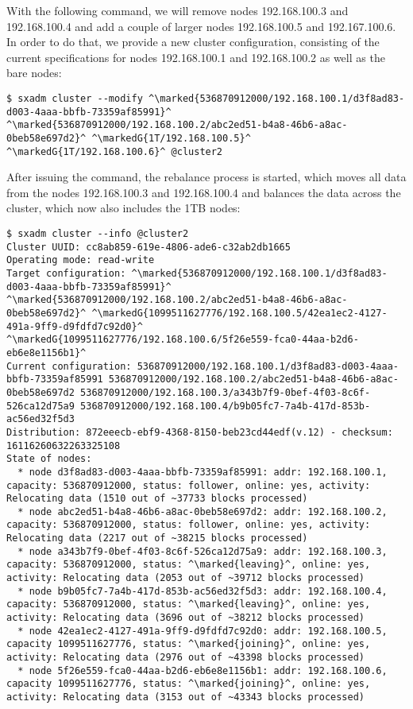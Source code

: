 With the following command, we will remove nodes 192.168.100.3 and
192.168.100.4 and add a couple of larger nodes 192.168.100.5 and
192.167.100.6. In order to do that, we provide a new cluster configuration,
consisting of the current specifications for nodes 192.168.100.1 and
192.168.100.2 as well as the bare nodes:
\begin{lstlisting}
$ sxadm cluster --modify ^\marked{536870912000/192.168.100.1/d3f8ad83-d003-4aaa-bbfb-73359af85991}^ ^\marked{536870912000/192.168.100.2/abc2ed51-b4a8-46b6-a8ac-0beb58e697d2}^ ^\markedG{1T/192.168.100.5}^ ^\markedG{1T/192.168.100.6}^ @cluster2
\end{lstlisting}
After issuing the command, the rebalance process is started, which moves all
data from the nodes 192.168.100.3 and 192.168.100.4 and balances the data across
the cluster, which now also includes the 1TB nodes:
\begin{lstlisting}
$ sxadm cluster --info @cluster2
Cluster UUID: cc8ab859-619e-4806-ade6-c32ab2db1665
Operating mode: read-write
Target configuration: ^\marked{536870912000/192.168.100.1/d3f8ad83-d003-4aaa-bbfb-73359af85991}^ ^\marked{536870912000/192.168.100.2/abc2ed51-b4a8-46b6-a8ac-0beb58e697d2}^ ^\markedG{1099511627776/192.168.100.5/42ea1ec2-4127-491a-9ff9-d9fdfd7c92d0}^ ^\markedG{1099511627776/192.168.100.6/5f26e559-fca0-44aa-b2d6-eb6e8e1156b1}^
Current configuration: 536870912000/192.168.100.1/d3f8ad83-d003-4aaa-bbfb-73359af85991 536870912000/192.168.100.2/abc2ed51-b4a8-46b6-a8ac-0beb58e697d2 536870912000/192.168.100.3/a343b7f9-0bef-4f03-8c6f-526ca12d75a9 536870912000/192.168.100.4/b9b05fc7-7a4b-417d-853b-ac56ed32f5d3
Distribution: 872eeecb-ebf9-4368-8150-beb23cd44edf(v.12) - checksum: 16116260632263325108
State of nodes:
  * node d3f8ad83-d003-4aaa-bbfb-73359af85991: addr: 192.168.100.1, capacity: 536870912000, status: follower, online: yes, activity: Relocating data (1510 out of ~37733 blocks processed)
  * node abc2ed51-b4a8-46b6-a8ac-0beb58e697d2: addr: 192.168.100.2, capacity: 536870912000, status: follower, online: yes, activity: Relocating data (2217 out of ~38215 blocks processed)
  * node a343b7f9-0bef-4f03-8c6f-526ca12d75a9: addr: 192.168.100.3, capacity: 536870912000, status: ^\marked{leaving}^, online: yes, activity: Relocating data (2053 out of ~39712 blocks processed)
  * node b9b05fc7-7a4b-417d-853b-ac56ed32f5d3: addr: 192.168.100.4, capacity: 536870912000, status: ^\marked{leaving}^, online: yes, activity: Relocating data (3696 out of ~38212 blocks processed)
  * node 42ea1ec2-4127-491a-9ff9-d9fdfd7c92d0: addr: 192.168.100.5, capacity 1099511627776, status: ^\marked{joining}^, online: yes, activity: Relocating data (2976 out of ~43398 blocks processed)
  * node 5f26e559-fca0-44aa-b2d6-eb6e8e1156b1: addr: 192.168.100.6, capacity 1099511627776, status: ^\marked{joining}^, online: yes, activity: Relocating data (3153 out of ~43343 blocks processed)
\end{lstlisting}
